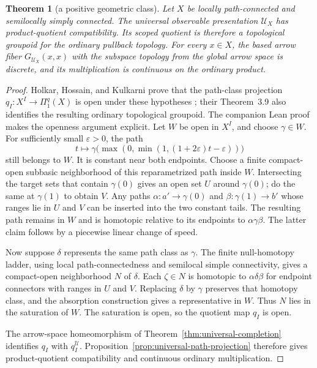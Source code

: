 \documentclass[10pt,reqno]{amsart}
\theoremstyle{definition}
\theoremstyle{plain}
\newtheorem{theorem}[definition]{Theorem}
\theoremstyle{remark}
\begin{document}
\begin{theorem}[a positive geometric class]
\label{thm:universal-open-groupoid}
Let $X$ be locally path-connected and semilocally simply connected.  The
universal observable presentation $\mathcal U_X$ has product-quotient
compatibility.  Its scoped quotient is therefore a topological groupoid for
the ordinary pullback topology.  For every $x\in X$, the based arrow fiber
$G_{\mathcal U_X}(x,x)$ with the subspace topology from the global arrow
space is discrete, and its multiplication is continuous on the ordinary
product.
\end{theorem}

\begin{proof}
Holkar, Hossain, and Kulkarni prove that the path-class projection
$q_I:X^I\to\Pi_1^q(X)$ is open under these hypotheses
\cite[Corollary~3.7]{HolkarHossainKulkarni24}; their
Theorem~3.9 also identifies the resulting ordinary topological groupoid.
The companion Lean proof makes the openness argument explicit. Let $W$ be
open in $X^I$, and choose $\gamma\in W$. For sufficiently small
$\varepsilon>0$, the path
\[
  t\longmapsto \gamma\bigl(\max(0,\min(1,(1+2\varepsilon)t-\varepsilon))\bigr)
\]
still belongs to $W$. It is constant near both endpoints. Choose a finite
compact-open subbasic neighborhood of this reparametrized path inside $W$.
Intersecting the target sets that contain $\gamma(0)$ gives an open set
$U$ around $\gamma(0)$; do the same at $\gamma(1)$ to obtain $V$.
Any paths $\alpha:a'\to\gamma(0)$ and
$\beta:\gamma(1)\to b'$ whose ranges lie in $U$ and $V$ can be inserted
into the two constant tails. The resulting path remains in $W$ and is
homotopic relative to its endpoints to $\alpha\gamma\beta$. The latter
claim follows by a piecewise linear change of speed.

Now suppose $\delta$ represents the same path class as $\gamma$.
The finite null-homotopy ladder, using local path-connectedness and
semilocal simple connectivity, gives a compact-open neighborhood $N$ of
$\delta$. Each $\zeta\in N$ is homotopic to
$\alpha\delta\beta$ for endpoint connectors with ranges in $U$ and $V$.
Replacing $\delta$ by $\gamma$ preserves that homotopy class, and the
absorption construction gives a representative in $W$. Thus $N$ lies in
the saturation of $W$. The saturation is open, so the quotient map $q_I$
is open.

The arrow-space homeomorphism of
Theorem~\ref{thm:universal-completion} identifies $q_I$ with
$q_I^{\mathcal U}$.  Proposition~\ref{prop:universal-path-projection}
therefore gives product-quotient compatibility and continuous ordinary
multiplication.


\end{proof}
\end{document}
